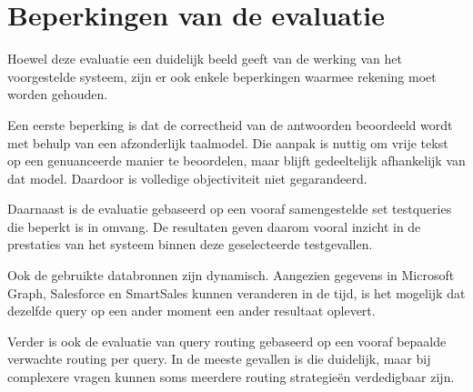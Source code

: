 \section{Beperkingen van de evaluatie}
\label{sec:evaluatie-beperkingen-methode}

Hoewel deze evaluatie een duidelijk beeld geeft van de werking van het voorgestelde systeem, zijn er ook enkele beperkingen waarmee rekening moet worden gehouden.

Een eerste beperking is dat de correctheid van de antwoorden beoordeeld wordt met behulp van een afzonderlijk taalmodel. Die aanpak is nuttig om vrije tekst op een genuanceerde manier te beoordelen, maar blijft gedeeltelijk afhankelijk van dat model. Daardoor is volledige objectiviteit niet gegarandeerd.

Daarnaast is de evaluatie gebaseerd op een vooraf samengestelde set testqueries die beperkt is in omvang. De resultaten geven daarom vooral inzicht in de prestaties van het systeem binnen deze geselecteerde testgevallen.

Ook de gebruikte databronnen zijn dynamisch. Aangezien gegevens in Microsoft Graph, Salesforce en SmartSales kunnen veranderen in de tijd, is het mogelijk dat dezelfde query op een ander moment een ander resultaat oplevert.

Verder is ook de evaluatie van query routing gebaseerd op een vooraf bepaalde verwachte routing per query. In de meeste gevallen is die duidelijk, maar bij complexere vragen kunnen soms meerdere routing strategieën verdedigbaar zijn.
